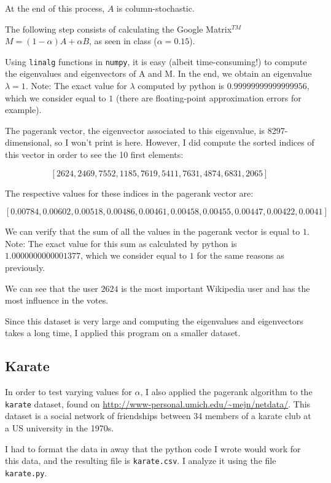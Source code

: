\documentclass[]{article}
\begin{document}
At the end of this process, $A$ is column-stochastic.

The following step consists of calculating the Google Matrix$^{TM}$ $M = (1-\alpha)A + \alpha B$, as seen in class ($\alpha = 0.15$).

Using \texttt{linalg} functions in \texttt{numpy}, it is easy (albeit time-consuming!) to compute the eigenvalues and eigenvectors of A and M. In the end, we obtain an eigenvalue $\lambda = 1$.  Note: The exact value for $\lambda$ computed by python is $0.99999999999999956$, which we consider equal to $1$ (there are floating-point approximation errors for example).

The pagerank vector, the eigenvector associated to this eigenvalue, is 8297-dimensional, so I won't print is here. However, I did compute the sorted indices of this vector in order to see the 10 first elements: 

$$[2624, 2469, 7552, 1185, 7619, 5411, 7631, 4874, 6831, 2065]$$

The respective values for these indices in the pagerank vector are:

$$[0.00784, 0.00602, 0.00518, 0.00486, 0.00461, 0.00458, 0.00455, 0.00447, 0.00422, 0.0041]$$

We can verify that the sum of all the values in the pagerank vector is equal to $1$. Note: The exact value for this sum as calculated by python is $1.0000000000001377$, which we consider equal to $1$ for the same reasons as previously.

We can see that the user $2624$ is the most important Wikipedia user and has the most influence in the votes.

Since this dataset is very large and computing the eigenvalues and eigenvectors takes a long time, I applied this program on a smaller dataset.


\subsection*{Karate}
In order to test varying values for $\alpha$, I also applied the pagerank algorithm to the \texttt{karate} dataset, found on \url{http://www-personal.umich.edu/~mejn/netdata/}. This dataset is a social network of friendships between 34 members of a karate club at a US university in the 1970s.

I had to format the data in away that the python code I wrote would work for this data, and the resulting file is \texttt{karate.csv}. I analyze it using the file \texttt{karate.py}.
\end{document}
